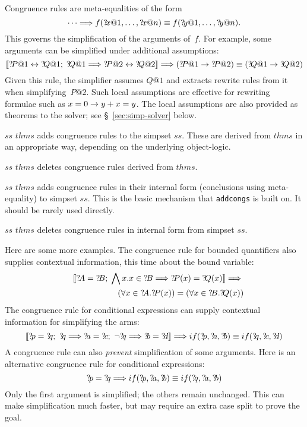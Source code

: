 Congruence rules are meta-equalities of the form
\[ \dots \Longrightarrow
   f({?\!x@1},\ldots,{?\!x@n}) \equiv f({?\!y@1},\ldots,{?\!y@n}).
\]
This governs the simplification of the arguments of~$f$.  For
example, some arguments can be simplified under additional assumptions:
\[ \List{\Var{P@1} \bimp \Var{Q@1};\; \Var{Q@1} \Imp \Var{P@2} \bimp \Var{Q@2}}
   \Imp (\Var{P@1} \imp \Var{P@2}) \equiv (\Var{Q@1} \imp \Var{Q@2})
\]
Given this rule, the simplifier assumes $Q@1$ and extracts rewrite
rules from it when simplifying~$P@2$.  Such local assumptions are
effective for rewriting formulae such as $x=0\rightarrow y+x=y$.  The local
assumptions are also provided as theorems to the solver; see
{\S}~\ref{sec:simp-solver} below.

\begin{ttdescription}
  
\item[$ss$ \ttindexbold{addcongs} $thms$] adds congruence rules to the
  simpset $ss$.  These are derived from $thms$ in an appropriate way,
  depending on the underlying object-logic.
  
\item[$ss$ \ttindexbold{delcongs} $thms$] deletes congruence rules
  derived from $thms$.
  
\item[$ss$ \ttindexbold{addeqcongs} $thms$] adds congruence rules in
  their internal form (conclusions using meta-equality) to simpset
  $ss$.  This is the basic mechanism that \texttt{addcongs} is built
  on.  It should be rarely used directly.
  
\item[$ss$ \ttindexbold{deleqcongs} $thms$] deletes congruence rules
  in internal form from simpset $ss$.
  
\end{ttdescription}

\medskip

Here are some more examples.  The congruence rule for bounded
quantifiers also supplies contextual information, this time about the
bound variable:
\begin{eqnarray*}
  &&\List{\Var{A}=\Var{B};\; 
          \Forall x. x\in \Var{B} \Imp \Var{P}(x) = \Var{Q}(x)} \Imp{} \\
 &&\qquad\qquad
    (\forall x\in \Var{A}.\Var{P}(x)) = (\forall x\in \Var{B}.\Var{Q}(x))
\end{eqnarray*}
The congruence rule for conditional expressions can supply contextual
information for simplifying the arms:
\[ \List{\Var{p}=\Var{q};~ \Var{q} \Imp \Var{a}=\Var{c};~
         \neg\Var{q} \Imp \Var{b}=\Var{d}} \Imp
   if(\Var{p},\Var{a},\Var{b}) \equiv if(\Var{q},\Var{c},\Var{d})
\]
A congruence rule can also {\em prevent\/} simplification of some arguments.
Here is an alternative congruence rule for conditional expressions:
\[ \Var{p}=\Var{q} \Imp
   if(\Var{p},\Var{a},\Var{b}) \equiv if(\Var{q},\Var{a},\Var{b})
\]
Only the first argument is simplified; the others remain unchanged.
This can make simplification much faster, but may require an extra case split
to prove the goal.  


